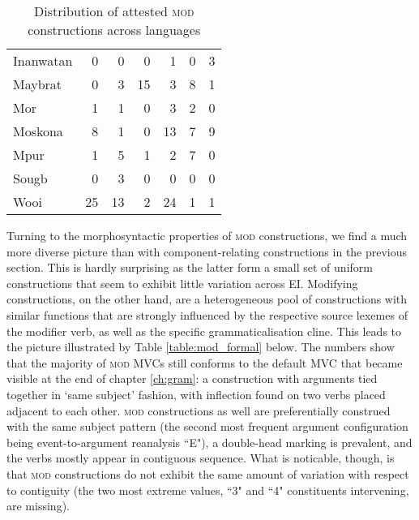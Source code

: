 \begin{table}
\begin{tabular}{lrrrrrr}
  Inanwatan &   0 &   0 &   0 &   1 &   0 &   3 \\ 
  Maybrat &   0 &   3 &  15 &   3 &   8 &   1 \\ 
  Mor &   1 &   1 &   0 &   3 &   2 &   0 \\ 
  Moskona &   8 &   1 &   0 &  13 &   7 &   9 \\ 
  Mpur &   1 &   5 &   1 &   2 &   7 &   0 \\ 
  Sougb &   0 &   3 &   0 &   0 &   0 &   0 \\ 
  Wooi &  25 &  13 &   2 &  24 &   1 &   1 \\ 
   \hline
   \end{tabular}
   \caption{Distribution of attested \textsc{mod} constructions across languages}
\label{table:MOD_language}

\end{table}


Turning to the morphosyntactic properties of \textsc{mod} constructions, we find a much more diverse picture than with component-relating constructions in the previous section. This is hardly surprising as the latter form a small set of uniform constructions that seem to exhibit little variation across EI. Modifying constructions, on the other hand, are a heterogeneous pool of constructions with similar functions that are strongly influenced by the respective source lexemes of the modifier verb, as well as the specific grammaticalisation cline. This leads to the picture illustrated by Table \ref{table:mod_formal} below. The numbers show that the majority of \textsc{mod} MVCs still conforms to the default \textsc{MVC} that became visible at the end of chapter \ref{ch:gram}: a construction with arguments tied together in `same subject' fashion, with inflection found on two verbs placed adjacent to each other. \textsc{mod} constructions as well are preferentially construed with the same subject pattern (the second most frequent argument configuration being event-to-argument reanalysis ``E"), a double-head marking is prevalent, and the verbs mostly appear in contiguous sequence. What is noticable, though, is that \textsc{mod} constructions do not exhibit the same amount of variation with respect to contiguity (the two most extreme values, ``3" and ``4" constituents intervening, are missing).

